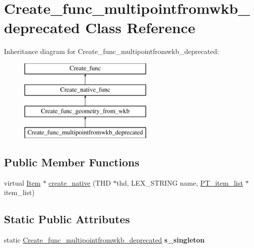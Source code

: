 \hypertarget{classCreate__func__multipointfromwkb__deprecated}{}\section{Create\+\_\+func\+\_\+multipointfromwkb\+\_\+deprecated Class Reference}
\label{classCreate__func__multipointfromwkb__deprecated}
Inheritance diagram for Create\+\_\+func\+\_\+multipointfromwkb\+\_\+deprecated\+:\begin{figure}[H]
\begin{center}
\leavevmode
\includegraphics[height=4.000000cm]{classCreate__func__multipointfromwkb__deprecated}
\end{center}
\end{figure}
\subsection*{Public Member Functions}
\begin{DoxyCompactItemize}
\item 
virtual \mbox{\hyperlink{classItem}{Item}} $\ast$ \mbox{\hyperlink{classCreate__func__multipointfromwkb__deprecated_a5f109e5e5ae27fa6c53ceb0976197204}{create\+\_\+native}} (T\+HD $\ast$thd, L\+E\+X\+\_\+\+S\+T\+R\+I\+NG name, \mbox{\hyperlink{classPT__item__list}{P\+T\+\_\+item\+\_\+list}} $\ast$item\+\_\+list)
\end{DoxyCompactItemize}
\subsection*{Static Public Attributes}
\begin{DoxyCompactItemize}
\item 
\mbox{\label{classCreate__func__multipointfromwkb__deprecated_aeff99f7dabf4f5877c1b979205484e7a}} 
static \mbox{\hyperlink{classCreate__func__multipointfromwkb__deprecated}{Create\+\_\+func\+\_\+multipointfromwkb\+\_\+deprecated}} {\bfseries s\+\_\+singleton}
\end{DoxyCompactItemize}
